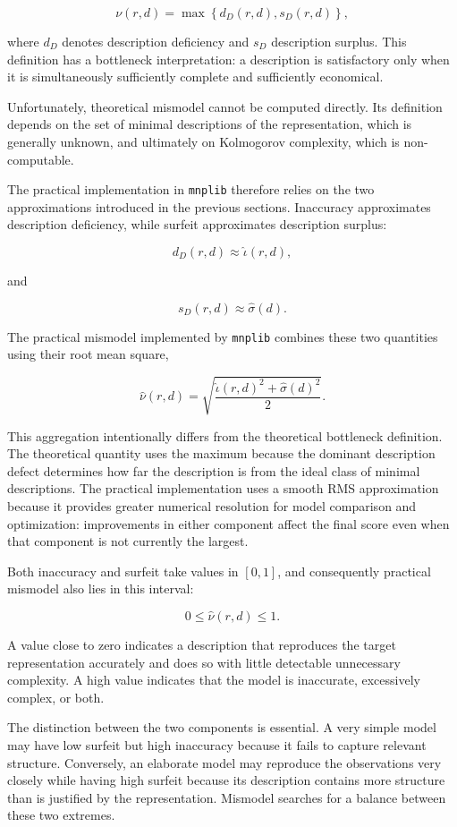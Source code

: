 \[
\nu(r,d)
=
\max\left\{
d_D(r,d),
s_D(r,d)
\right\},
\]

where \(d_D\) denotes description deficiency and \(s_D\) description surplus.
This definition has a bottleneck interpretation: a description is satisfactory
only when it is simultaneously sufficiently complete and sufficiently economical.

Unfortunately, theoretical mismodel cannot be computed directly. Its definition
depends on the set of minimal descriptions of the representation, which is
generally unknown, and ultimately on Kolmogorov complexity, which is
non-computable.

The practical implementation in \texttt{mnplib} therefore relies on the two
approximations introduced in the previous sections. Inaccuracy approximates
description deficiency, while surfeit approximates description surplus:

\[
d_D(r,d)
\approx
\widehat\iota(r,d),
\]

and

\[
s_D(r,d)
\approx
\widehat\sigma(d).
\]

The practical mismodel implemented by \texttt{mnplib} combines these two
quantities using their root mean square,

\[
\widehat\nu(r,d)
=
\sqrt{
\frac{
\widehat\iota(r,d)^2
+
\widehat\sigma(d)^2
}{2}
}.
\]

This aggregation intentionally differs from the theoretical bottleneck
definition. The theoretical quantity uses the maximum because the dominant
description defect determines how far the description is from the ideal class
of minimal descriptions. The practical implementation uses a smooth RMS
approximation because it provides greater numerical resolution for model
comparison and optimization: improvements in either component affect the final
score even when that component is not currently the largest.

Both inaccuracy and surfeit take values in \([0,1]\), and consequently practical
mismodel also lies in this interval:

\[
0\leq
\widehat\nu(r,d)
\leq1.
\]

A value close to zero indicates a description that reproduces the target
representation accurately and does so with little detectable unnecessary
complexity. A high value indicates that the model is inaccurate, excessively
complex, or both.

The distinction between the two components is essential. A very simple model
may have low surfeit but high inaccuracy because it fails to capture relevant
structure. Conversely, an elaborate model may reproduce the observations very
closely while having high surfeit because its description contains more
structure than is justified by the representation. Mismodel searches for a
balance between these two extremes.

